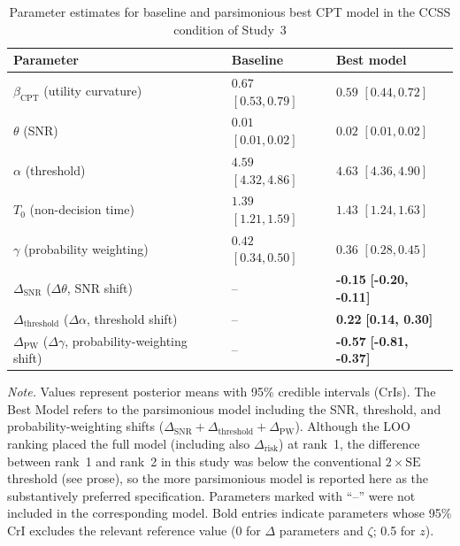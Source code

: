\documentclass[man,floatsintext]{apa7}
\begin{document}
\begin{table}[!htbp]
\centering
\begin{threeparttable}\small
\caption{Parameter estimates for baseline and parsimonious best CPT model in the CCSS condition of Study~3}
\label{tab:cpt_pe_ccss_study3}
\begin{tabularx}{\linewidth}{@{} >{\raggedright\arraybackslash}p{6cm} >{\centering\arraybackslash}X >{\centering\arraybackslash}X @{}}
\toprule
\textbf{Parameter} & \textbf{Baseline} & \textbf{Best model} \\
\midrule
$\beta_{\text{CPT}}$ (utility curvature) & $0.67$ $[0.53, 0.79]$ & $0.59$ $[0.44, 0.72]$ \\
$\theta$ (SNR) & $0.01$ $[0.01, 0.02]$ & $0.02$ $[0.01, 0.02]$ \\
$\alpha$ (threshold) & $4.59$ $[4.32, 4.86]$ & $4.63$ $[4.36, 4.90]$ \\
$T_0$ (non-decision time) & $1.39$ $[1.21, 1.59]$ & $1.43$ $[1.24, 1.63]$ \\
$\gamma$ (probability weighting) & $0.42$ $[0.34, 0.50]$ & $0.36$ $[0.28, 0.45]$ \\
$\Delta_{\text{SNR}}$ ($\Delta\theta$, SNR shift) & -- & \textbf{-0.15} \textbf{[-0.20, -0.11]} \\
$\Delta_{\text{threshold}}$ ($\Delta\alpha$, threshold shift) & -- & \textbf{0.22} \textbf{[0.14, 0.30]} \\
$\Delta_{\text{PW}}$ ($\Delta\gamma$, probability-weighting shift) & -- & \textbf{-0.57} \textbf{[-0.81, -0.37]} \\
\bottomrule
\end{tabularx}
\begin{tablenotes}
\item \textit{Note.} Values represent posterior means with 95\% credible intervals (CrIs). The Best Model refers to the parsimonious model including the SNR, threshold, and probability-weighting shifts ($\Delta_{\text{SNR}}+\Delta_{\text{threshold}}+\Delta_{\text{PW}}$). Although the LOO ranking placed the full model (including also $\Delta_{\text{risk}}$) at rank~1, the difference between rank~1 and rank~2 in this study was below the conventional $2 \times \mathrm{SE}$ threshold (see prose), so the more parsimonious model is reported here as the substantively preferred specification. Parameters marked with ``--'' were not included in the corresponding model. Bold entries indicate parameters whose 95\% CrI excludes the relevant reference value (0 for $\Delta$ parameters and $\zeta$; 0.5 for $z$).
\end{tablenotes}
\end{threeparttable}
\end{table}
\end{document}
